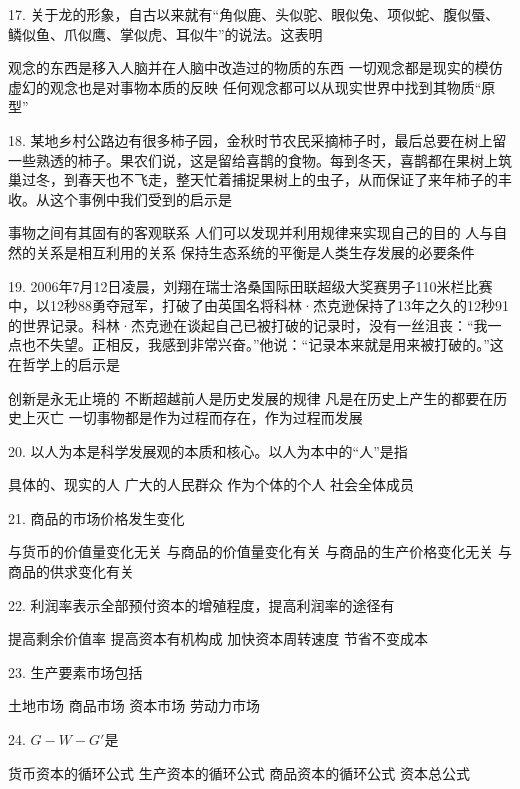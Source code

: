 17. 关于龙的形象，自古以来就有“角似鹿、头似驼、眼似兔、项似蛇、腹似蜃、鳞似鱼、爪似鹰、掌似虎、耳似牛”的说法。这表明
\begin{choices}
	 观念的东西是移入人脑并在人脑中改造过的物质的东西
	 一切观念都是现实的模仿
	 虚幻的观念也是对事物本质的反映
	 任何观念都可以从现实世界中找到其物质“原型”
\end{choices}
18. 某地乡村公路边有很多柿子园，金秋时节农民采摘柿子时，最后总要在树上留一些熟透的柿子。果农们说，这是留给喜鹊的食物。每到冬天，喜鹊都在果树上筑巢过冬，到春天也不飞走，整天忙着捕捉果树上的虫子，从而保证了来年柿子的丰收。从这个事例中我们受到的启示是
\begin{choices}
	 事物之间有其固有的客观联系
	 人们可以发现并利用规律来实现自己的目的
	 人与自然的关系是相互利用的关系
	 保持生态系统的平衡是人类生存发展的必要条件
\end{choices}
19. 2006年7月12日凌晨，刘翔在瑞士洛桑国际田联超级大奖赛男子110米栏比赛中，以12秒88勇夺冠军，打破了由英国名将科林·杰克逊保持了13年之久的12秒91的世界记录。科林·杰克逊在谈起自己已被打破的记录时，没有一丝沮丧：“我一点也不失望。正相反，我感到非常兴奋。”他说：“记录本来就是用来被打破的。”这在哲学上的启示是
\begin{choices}
	 创新是永无止境的
	 不断超越前人是历史发展的规律
	 凡是在历史上产生的都要在历史上灭亡
	 一切事物都是作为过程而存在，作为过程而发展
\end{choices}
20. 以人为本是科学发展观的本质和核心。以人为本中的“人”是指
\begin{choices}
	 具体的、现实的人
	 广大的人民群众
	 作为个体的个人
	 社会全体成员
\end{choices}
21. 商品的市场价格发生变化
\begin{choices}
	 与货币的价值量变化无关
	 与商品的价值量变化有关
	 与商品的生产价格变化无关
	 与商品的供求变化有关
\end{choices}
22. 利润率表示全部预付资本的增殖程度，提高利润率的途径有
\begin{choices}
	 提高剩余价值率
	 提高资本有机构成
	 加快资本周转速度
	 节省不变成本
\end{choices}
23. 生产要素市场包括
\begin{choices}
	 土地市场
	 商品市场
	 资本市场
	 劳动力市场
\end{choices}
24. $G-W-G'$是
\begin{choices}
	 货币资本的循环公式
	 生产资本的循环公式
	 商品资本的循环公式
	 资本总公式
\end{choices}
